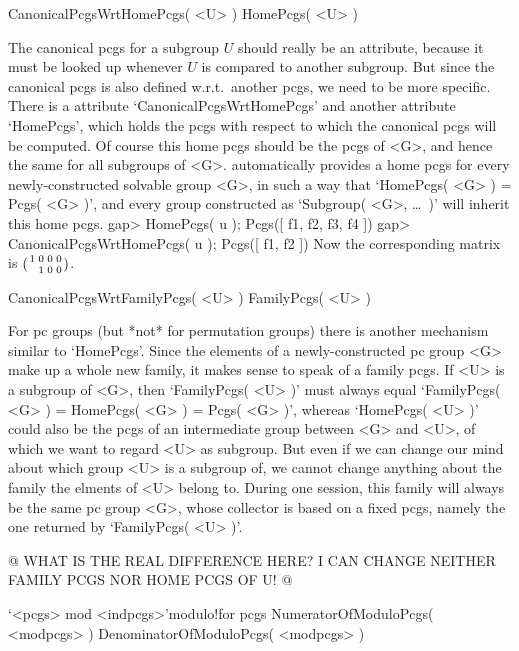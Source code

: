 \>CanonicalPcgsWrtHomePcgs( <U> )
\>HomePcgs( <U> )

The  canonical pcgs  for  a subgroup  $U$ should really  be an attribute,
because it  must be looked   up  whenever $U$   is  compared to   another
subgroup. But since  the canonical pcgs  is also  defined w.r.t.\ another
pcgs, we   need to  be  more  specific.   There  is  a  {\GAP}  attribute
`CanonicalPcgsWrtHomePcgs' and  another attribute `HomePcgs', which holds
the pcgs with respect  to which the  canonical pcgs will be computed.  Of
course this home pcgs should be  the pcgs of <G>, and  hence the same for
all subgroups of <G>. {\GAP} automatically provides a home pcgs for every
newly-constructed solvable group <G>, in such a way that `HomePcgs( <G> )
= Pcgs( <G> )', and every group constructed as  `Subgroup( <G>, \dots\ )'
will inherit this home pcgs.
\beginexample
    gap> HomePcgs( u );
    Pcgs([ f1, f2, f3, f4 ])
    gap> CanonicalPcgsWrtHomePcgs( u );
    Pcgs([ f1, f2 ])
\endexample
Now the corresponding matrix is
$({1\atop} {0\atop1} {0\atop0} {0\atop0})$.

\>CanonicalPcgsWrtFamilyPcgs( <U> )
\>FamilyPcgs( <U> )

For  pc   groups (but *not*   for permutation  groups)   there is another
mechanism  similar  to  `HomePcgs'.      Since  the  elements      of   a
newly-constructed pc group <G> make up a whole new family, it makes sense
to speak of a family pcgs. If <U> is a subgroup of <G>, then `FamilyPcgs(
<U> )' must always equal `FamilyPcgs( <G> ) = HomePcgs( <G> ) = Pcgs( <G>
)', whereas `HomePcgs( <U> )'  could also be  the pcgs of an intermediate
group between <G> and  <U>, of which we  want to regard <U>  as subgroup.
But even if  we can change  our mind about which  group <U> is a subgroup
of, we cannot change anything about the family  the elments of <U> belong
to.  During one {\GAP}  session, this family  will always  be the same pc
group  <G>,  whose collector is  based on  a fixed  pcgs,  namely the one
returned by `FamilyPcgs( <U> )'.

@ WHAT IS THE REAL DIFFERENCE HERE? I CAN CHANGE  NEITHER FAMILY PCGS NOR
HOME PCGS OF U! @

\null

\>`<pcgs> mod <indpcgs>'{modulo}!{for pcgs}
\>NumeratorOfModuloPcgs( <modpcgs> )
\>DenominatorOfModuloPcgs( <modpcgs> )

